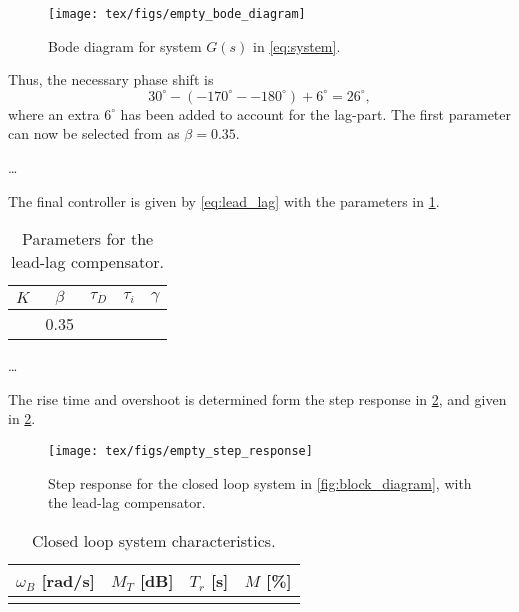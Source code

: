 \documentclass[a4paper]{article}
\begin{document}
\begin{figure}[h!]
	\begin{center}
		\texttt{[image: tex/figs/empty\_bode\_diagram]}
	\end{center}
	\caption{Bode diagram for system $G(s)$ in \eqref{eq:system}.}
	\label{fig:bode_diagram}
\end{figure}

Thus, the necessary phase shift is
\[
	30^\circ - (-170^\circ - -180^\circ) + 6^\circ = 26^\circ,
\]
where an extra $6^\circ$ has been added to account for the lag-part. The first parameter can now be selected from \cite[fig. 5.13]{basic_book} as $\beta = 0.35$.

\ldots

The final controller is given by \cref{eq:lead_lag} with the parameters in \cref{tb:lead_lag_parameters}.
\begin{table}
\begin{center}
	\begin{tabular}{|c|c|c|c|c|}
		\hline
		$K$ & $\beta$ & $\tau_D$ & $\tau_i$ & $\gamma$\\
		\hline
		& 0.35 & & &\\
		\hline
	\end{tabular}
\end{center}
\caption{Parameters for the lead-lag compensator.}
\label{tb:lead_lag_parameters}
\end{table}

\ldots

The rise time and overshoot is determined form the step response in \cref{fig:step_response}, and given in \cref{tb:response}.

\begin{figure}[h!]
	\begin{center}
		\texttt{[image: tex/figs/empty\_step\_response]}
	\end{center}
	\caption{Step response for the closed loop system in \cref{fig:block_diagram}, with the lead-lag compensator.}
	\label{fig:step_response}
\end{figure}

\begin{table}[h!]
\begin{center}
	\begin{tabular}{|c|c|c|c|}
		\hline
		$\omega_B$ [rad/s] & $M_T$ [dB] & $T_r$ [s] & $M$ [\%] \\
		\hline
		& & & \\
		\hline
	\end{tabular}
\end{center}
\caption{Closed loop system characteristics.}
\label{tb:response}
\end{table}
\end{document}
